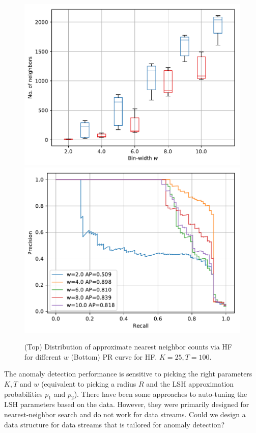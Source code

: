 \documentclass[11pt,onecolumn]{article}
\begin{document}
\begin{figure}
    \centering
		\includegraphics[width=\linewidth]{fig/K25T100_nn.pdf}
		\includegraphics[width=\linewidth]{fig/k25T100_pr2.pdf}
    \caption{\small (Top) Distribution of approximate nearest neighbor counts via HF for different $w$ (Bottom) PR curve for HF. $K=25, T=100$.}
\end{figure}

The anomaly detection performance is sensitive to picking the right parameters $K, T$ and $w$ (equivalent to picking a radius $R$ and the LSH approximation probabilities $p_1$ and $p_2$). There have been some approaches to auto-tuning the LSH parameters based on the data. However, they were primarily designed for nearest-neighbor search and do not work for data streams. Could we design a data structure for data streams that is tailored for anomaly detection?
\end{document}

